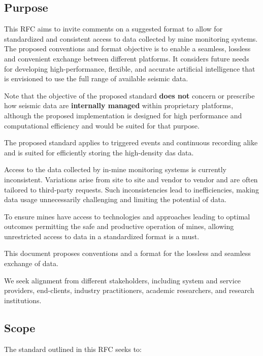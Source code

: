 \subsection{Purpose}

This RFC aims to invite comments on a suggested format to allow for standardized and consistent access to \museismic data collected by mine \museismic monitoring systems. The proposed conventions and format objective is to enable a seamless, lossless and convenient exchange between different platforms. It considers future needs for developing high-performance, flexible, and accurate artificial intelligence that is envisioned to use the full range of available seismic data. 

Note that the objective of the proposed standard \textbf{does not} concern or prescribe how seismic data are \textbf{internally managed} within proprietary platforms, although the proposed implementation is designed for high performance and computational efficiency and would be suited for that purpose.

The proposed standard applies to triggered events and continuous recording alike and is suited for efficiently storing the high-density \gls{das} data.

Access to the \museismic data collected by in-mine monitoring systems is currently inconsistent. Variations arise from site to site and vendor to vendor and are often tailored to third-party requests. Such inconsistencies lead to inefficiencies, making data usage unnecessarily challenging and limiting the potential of \museismic data.

To ensure mines have access to technologies and approaches leading to optimal outcomes permitting the safe and productive operation of mines, allowing unrestricted access to \museismic data in a standardized format is a must. 

This document proposes conventions and a format for the lossless and seamless exchange of \museismic data. 

We seek alignment from different stakeholders, including \museismic system and service providers, end-clients, industry practitioners, academic researchers, and research institutions.

\subsection{Scope}

The standard outlined in this RFC seeks to:

